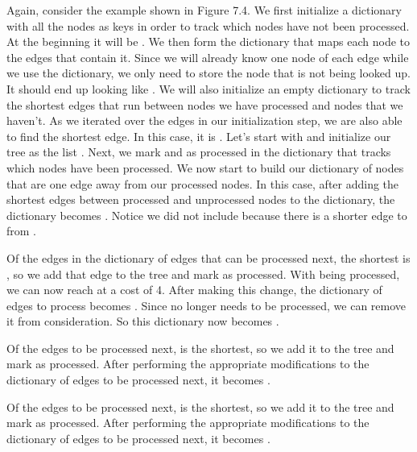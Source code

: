 Again, consider the example shown in Figure 7.4.
We first initialize a dictionary with all the nodes as keys in order to track which nodes have not been processed.
At the beginning it will be .
We then form the dictionary that maps each node to the edges that contain it.
Since we will already know one node of each edge while we use the dictionary, we only need to store the node that is not being looked up.
It should end up looking like .
We will also initialize an empty dictionary to track the shortest edges that run between nodes we have processed and nodes that we haven't.
As we iterated over the edges in our initialization step, we are also able to find the shortest edge.
In this case, it is .
Let's start with  and initialize our tree as the list \li{[(D, C, 1)]}.
Next, we mark  and  as processed in the dictionary that tracks which nodes have been processed.
We now start to build our dictionary of nodes that are one edge away from our processed nodes.
In this case, after adding the shortest edges between processed and unprocessed nodes to the dictionary, the dictionary becomes .
Notice we did not include  because there is a shorter edge to  from .

Of the edges in the dictionary of edges that can be processed next, the shortest is , so we add that edge to the tree and mark  as processed.
With  being processed, we can now reach  at a cost of 4.
After making this change, the dictionary of edges to process becomes .
Since  no longer needs to be processed, we can remove it from consideration.
So this dictionary now becomes .

Of the edges to be processed next,  is the shortest, so we add it to the tree and mark  as processed.
After performing the appropriate modifications to the dictionary of edges to be processed next, it becomes .

Of the edges to be processed next,  is the shortest, so we add it to the tree and mark  as processed.
After performing the appropriate modifications to the dictionary of edges to be processed next, it becomes .


